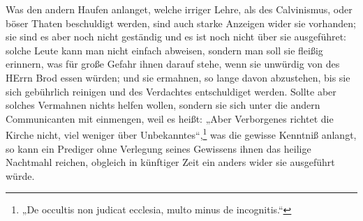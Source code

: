 Was den andern Haufen anlanget, welche irriger Lehre, als des Calvinismus, oder böser Thaten beschuldigt werden, sind auch starke Anzeigen wider sie vorhanden; sie sind es aber noch nicht geständig und es ist noch nicht über sie ausgeführet: solche Leute kann man nicht einfach abweisen, sondern man soll sie fleißig erinnern, was für große Gefahr ihnen darauf stehe, wenn sie unwürdig von des HErrn Brod essen würden; und sie ermahnen, so lange davon abzustehen, bis sie sich gebührlich reinigen und des Verdachtes entschuldiget werden. Sollte aber solches Vermahnen nichts helfen wollen, sondern sie sich unter die andern Communicanten mit einmengen, weil es heißt: „Aber Verborgenes richtet die Kirche nicht, viel weniger über Unbekanntes“,\footnote{„De occultis non judicat ecclesia, multo minus de incognitis.“} was die gewisse Kenntniß anlangt, so kann ein Prediger ohne Verlegung seines Gewissens ihnen das heilige Nachtmahl reichen, obgleich in künftiger Zeit ein anders wider sie ausgeführt würde.


